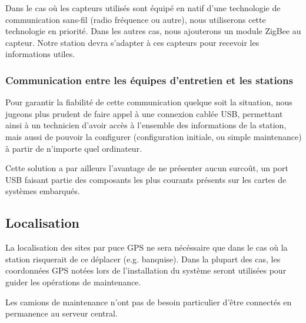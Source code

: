 Dans le cas où les capteurs utilisés sont équipé en natif d’une technologie de communication sans-fil (radio fréquence ou autre), nous utiliserons cette technologie en priorité. Dans les autres cas, nous ajouterons un module ZigBee au capteur. Notre station devra s’adapter à ces capteurs pour recevoir les informations utiles.

\subsubsection{Communication entre les équipes d’entretien et les stations}

Pour garantir la fiabilité de cette communication quelque soit la situation, nous jugeons plus prudent de faire appel à une connexion cablée USB, permettant ainsi à un technicien d’avoir accès à l’ensemble des informations de la station, mais aussi de pouvoir la configurer (configuration initiale, ou simple maintenance) à partir de n’importe quel ordinateur.

Cette solution a par ailleurs l’avantage de ne présenter aucun surcoût, un port USB faisant partie des composants les plus courants présents sur les cartes de systèmes embarqués.

\subsection{Localisation}

La localisation des sites par puce GPS ne sera nécéssaire que dans le cas où la station risquerait de ce déplacer (e.g. banquise). Dans la plupart des cas, les coordonnées GPS notées lors de l’installation du système seront utilisées pour guider les opérations de maintenance.

Les camions de maintenance n'ont pas de besoin particulier d'être connectés en permanence au serveur central.


	 	
